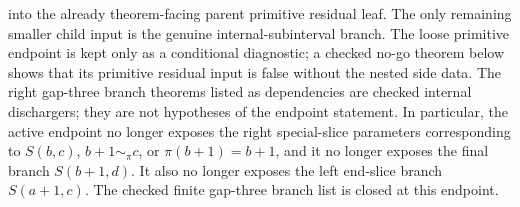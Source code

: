 \begin{theorem}
  into the already theorem-facing parent primitive residual leaf.  The only
  remaining smaller child input is the genuine internal-subinterval branch.
  The loose
  primitive endpoint is kept only as a conditional diagnostic; a checked no-go
  theorem below shows that its primitive residual input is false without the
  nested side data.
  The right gap-three branch theorems listed as dependencies are checked
  internal dischargers; they are not hypotheses of the endpoint statement.
  In particular, the active endpoint no longer exposes the right special-slice
  parameters corresponding to \(S(b,c)\), \(b+1\sim_\pi c\), or
  \(\pi(b+1)=b+1\), and it no longer exposes the final branch
  \(S(b+1,d)\).  It also no longer exposes the left end-slice branch
  \(S(a+1,c)\).  The checked finite gap-three branch list is closed at this
  endpoint.
\end{theorem}

